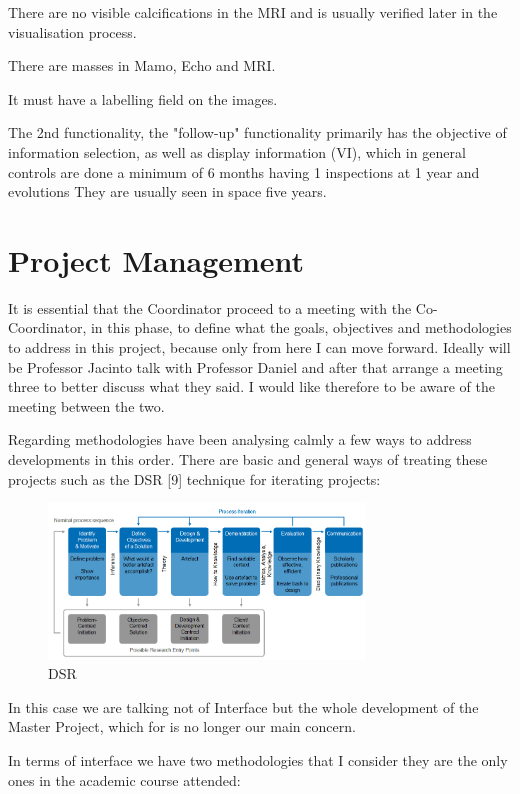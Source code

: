 There are no visible calcifications in the MRI and is usually verified later in the visualisation process.

There are masses in Mamo, Echo and MRI.

It must have a labelling field on the images.

The 2nd functionality, the "follow-up" functionality primarily has the objective of information selection, as well as display information (VI), which in general controls are done a minimum of 6 months having 1 inspections at 1 year and evolutions They are usually seen in space five years.

\section{Project Management}

It is essential that the Coordinator proceed to a meeting with the Co-Coordinator, in this phase, to define what the goals, objectives and methodologies to address in this project, because only from here I can move forward. Ideally will be Professor Jacinto talk with Professor Daniel and after that arrange a meeting three to better discuss what they said. I would like therefore to be aware of the meeting between the two.

Regarding methodologies have been analysing calmly a few ways to address developments in this order. There are basic and general ways of treating these projects such as the DSR [9] technique for iterating projects:

\begin{figure}[!hbt]
\centering
\includegraphics[width=0.75\textwidth]{diss_goebel_2.png}
\caption{\label{fig:frog}DSR}
\end{figure}

In this case we are talking not of Interface but the whole development of the Master Project, which for is no longer our main concern.

In terms of interface we have two methodologies that I consider they are the only ones in the academic course attended:

